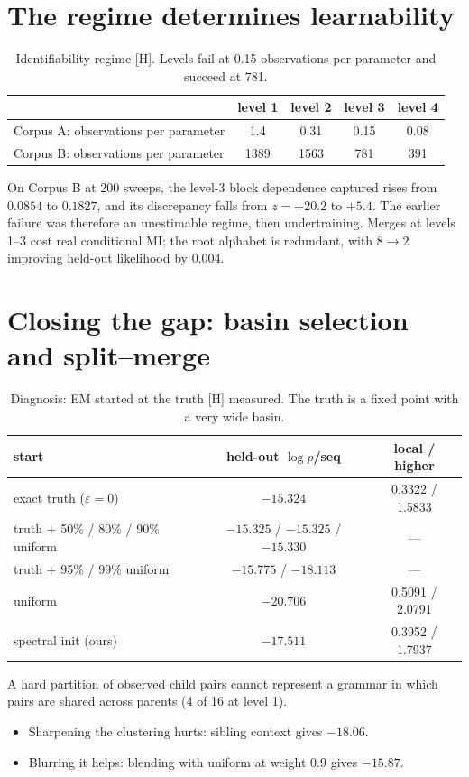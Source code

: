 \documentclass[11pt]{article}
\theoremstyle{definition}
\theoremstyle{remark}
\newcommand{\src}[1]{\textsf{\small[#1]}}
\newcommand{\st}[1]{\textsf{\small\color{gray}#1}}
\begin{document}
\section{The regime determines learnability}
\begin{table}[h]\centering\small
\begin{tabular}{lcccc}
\toprule
 & level 1 & level 2 & level 3 & level 4\\
\midrule
Corpus A: observations per parameter & 1.4 & 0.31 & 0.15 & 0.08\\
Corpus B: observations per parameter & 1389 & 1563 & 781 & 391\\
\bottomrule
\end{tabular}
\caption{Identifiability regime \src{H}. Levels fail at 0.15 observations per parameter and succeed at 781.}
\end{table}
On Corpus B at 200 sweeps, the level-3 block dependence captured rises from $0.0854$ to $0.1827$, and its discrepancy falls from $z=+20.2$ to $+5.4$. The earlier failure was therefore an unestimable regime, then undertraining. Merges at levels 1--3 cost real conditional MI; the root alphabet is redundant, with $8\to2$ improving held-out likelihood by $0.004$.

\section{Closing the gap: basin selection and split--merge}
\begin{table}[h]\centering\small
\begin{tabular}{lcc}
\toprule
start & held-out $\log p$/seq & local / higher\\
\midrule
exact truth ($\varepsilon=0$) & $-15.324$ & 0.3322 / 1.5833\\
truth + 50\% / 80\% / 90\% uniform & $-15.325$ / $-15.325$ / $-15.330$ & ---\\
truth + 95\% / 99\% uniform & $-15.775$ / $-18.113$ & ---\\
uniform & $-20.706$ & 0.5091 / 2.0791\\
spectral init (ours) & $-17.511$ & 0.3952 / 1.7937\\
\bottomrule
\end{tabular}
\caption{Diagnosis: EM started at the truth \src{H} \st{measured}. The truth is a fixed point with a very wide basin.}
\end{table}

\noindent A hard partition of observed child pairs cannot represent a grammar in which pairs are shared across parents (4 of 16 at level 1).
\begin{itemize}
  \item Sharpening the clustering hurts: sibling context gives $-18.06$.
  \item Blurring it helps: blending with uniform at weight 0.9 gives $-15.87$.
\end{itemize}
\end{document}
